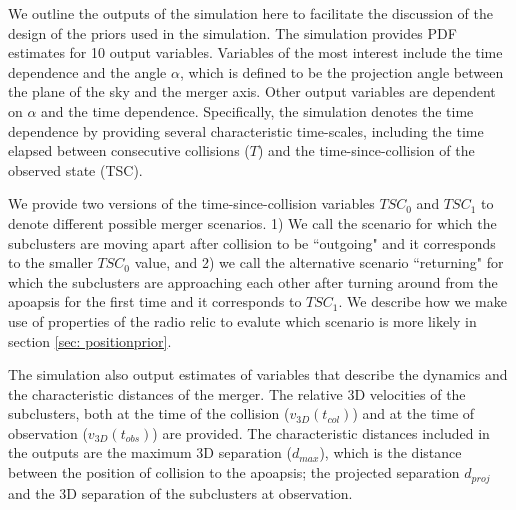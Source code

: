 We outline the outputs of the simulation here to facilitate the discussion
of the design of the priors used in the simulation. The simulation
provides PDF estimates for 10 output variables. Variables
of the most interest include the time dependence and the angle $\alpha$, which is
defined to be the projection angle between the plane of the sky and the merger axis. Other output variables are dependent on $\alpha$ and the time
dependence. Specifically, the simulation denotes the time dependence by
providing several characteristic time-scales, including the time
elapsed between consecutive collisions
($T$) and the time-since-collision of the observed state (TSC).  

We provide two versions of the time-since-collision variables $TSC_0$ and
$TSC_1$ to denote different possible merger scenarios. 1) We call the scenario for which the subclusters are
moving apart after collision to be ``outgoing" and it corresponds to the
smaller $TSC_0$ value, and 2) we call the alternative scenario 
``returning" for which the subclusters are approaching each other after turning
around from the apoapsis for the first time and it corresponds to $TSC_1$.
We describe how we make use of properties of the radio relic to evalute
which scenario is more likely in
section \ref{sec: positionprior}. 
 
The simulation also output estimates of variables that describe
the dynamics and the characteristic distances of the merger. The relative
3D velocities of the subclusters, both at the time of the
collision ($v_{3D}(t_{col})$) and at the time of observation
($v_{3D}(t_{obs})$) are provided. The characteristic
distances included in the outputs are the maximum 3D separation ($d_{max}$),
which is the distance between the position of collision to
the apoapsis; the projected separation $d_{proj}$ and the 3D separation of the subclusters at observation. 

%

